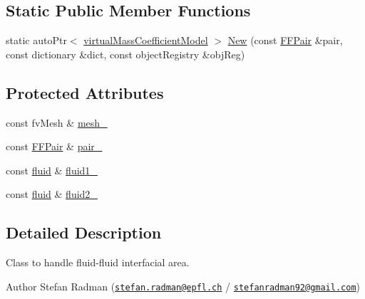\subsection*{Static Public Member Functions}
\begin{DoxyCompactItemize}
\item 
static auto\+Ptr$<$ \hyperlink{classFoam_1_1virtualMassCoefficientModel}{virtual\+Mass\+Coefficient\+Model} $>$ \hyperlink{classFoam_1_1virtualMassCoefficientModel_aefcea09c36590e0ae882b41fd51f0589}{New} (const \hyperlink{classFoam_1_1FFPair}{F\+F\+Pair} \&pair, const dictionary \&dict, const object\+Registry \&obj\+Reg)
\end{DoxyCompactItemize}
\subsection*{Protected Attributes}
\begin{DoxyCompactItemize}
\item 
const fv\+Mesh \& \hyperlink{classFoam_1_1virtualMassCoefficientModel_a23edeeeecebcef11921a33dd5d990570}{mesh\+\_\+}
\item 
const \hyperlink{classFoam_1_1FFPair}{F\+F\+Pair} \& \hyperlink{classFoam_1_1virtualMassCoefficientModel_ad015e769561f394d7c717d4356dcded4}{pair\+\_\+}
\item 
const \hyperlink{classFoam_1_1fluid}{fluid} \& \hyperlink{classFoam_1_1virtualMassCoefficientModel_a5e2d96f5c8eaf3d2ba2fd36db82b8e8b}{fluid1\+\_\+}
\item 
const \hyperlink{classFoam_1_1fluid}{fluid} \& \hyperlink{classFoam_1_1virtualMassCoefficientModel_a10350fa01c5980453030c19e26a2253f}{fluid2\+\_\+}
\end{DoxyCompactItemize}


\subsection{Detailed Description}
Class to handle fluid-\/fluid interfacial area. 

\label{_Description}%
 Author Stefan Radman (\href{mailto:stefan.radman@epfl.ch}{\tt stefan.\+radman@epfl.\+ch} / \href{mailto:stefanradman92@gmail.com}{\tt stefanradman92@gmail.\+com})

